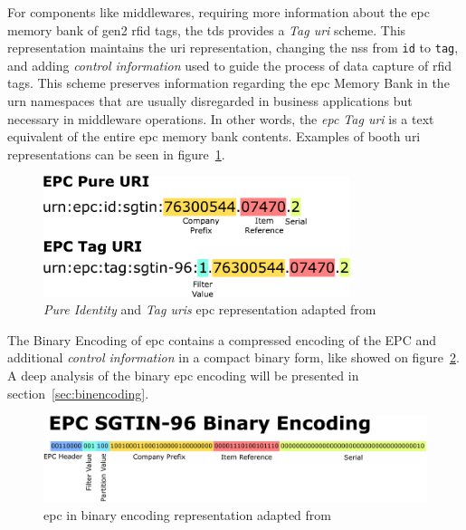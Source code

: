 For components like middlewares, requiring more information about the \ac{epc} memory bank of \ac{gen2} \ac{rfid} tags, the \ac{tds} provides a \emph{Tag \ac{uri}} scheme.
This representation maintains the \ac{uri} representation, changing the \ac{nss} from \texttt{id} to \texttt{tag}, and adding \textit{control information} used to guide the process of data capture of \ac{rfid} tags.
This scheme preserves information regarding the \ac{epc} Memory Bank in the \ac{urn} namespaces that are usually disregarded in business applications but necessary in middleware operations.
In other words, the \emph{\ac{epc} Tag \ac{uri}} is a text equivalent of the entire \ac{epc} memory bank contents.
Examples of booth \ac{uri} representations can be seen in figure~\ref{fig:epcurirepresentation}. 

\begin{figure}[!ht]
    \centering
    \includegraphics[width=0.8\textwidth]{./figs/02-state-of-the-art/SGTIN_First2encodings.pdf}
    \caption[\emph{Pure Identity} and \emph{Tag \acp{uri}} \ac{epc} representation]{\emph{Pure Identity} and \emph{Tag \acp{uri}} \ac{epc} representation adapted from~\cite{SGTININFO}} 
    \label{fig:epcurirepresentation}
\end{figure}

The Binary Encoding of \ac{epc} contains a compressed encoding of the EPC and additional \textit{control information} in a compact binary form, like showed on figure~\ref{fig:epcbinencoding}.
A deep analysis of the binary \ac{epc} encoding will be presented in section~\ref{sec:binencoding}.

\begin{figure}[!ht]
    \centering
    \vspace*{0.5cm}
    \includegraphics[width=\textwidth]{./figs/02-state-of-the-art/SGTIN_binaryconv2.pdf}
    \caption[\ac{epc} in binary encoding representation]{\ac{epc} in binary encoding representation adapted from~\cite{SGTININFO}} 
    \label{fig:epcbinencoding}
\end{figure}

